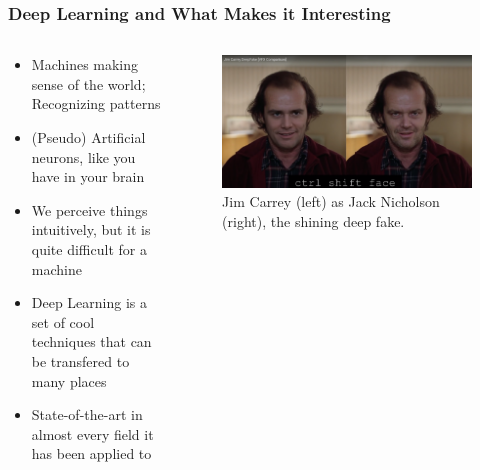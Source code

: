 \documentclass[aspectratio=169]{beamer}
\begin{document}
  \begin{frame}
    \frametitle{Deep Learning and What Makes it Interesting}
    \begin{columns}
      \begin{column}{0.5\textwidth}
        \begin{itemize}
          \item Machines making sense of the world; Recognizing patterns
          \item (Pseudo) Artificial neurons, like you have in your brain
          \item We perceive things intuitively, but it is quite difficult for a machine
          \item Deep Learning is a set of cool techniques that can be transfered to many places
          \item State-of-the-art in almost every field it has been applied to
        \end{itemize}
      \end{column}
      \begin{column}{0.5\textwidth}
        \begin{figure}[th!]
          \centering
          \includegraphics[width=1\textwidth]{jim_carrey.png}
          \caption{Jim Carrey (left) as Jack Nicholson (right), the shining deep fake.\autocite{deepfake}}
          \label{fig:jim_carrey}
        \end{figure}
      \end{column}
    \end{columns}
  \end{frame}
\end{document}
